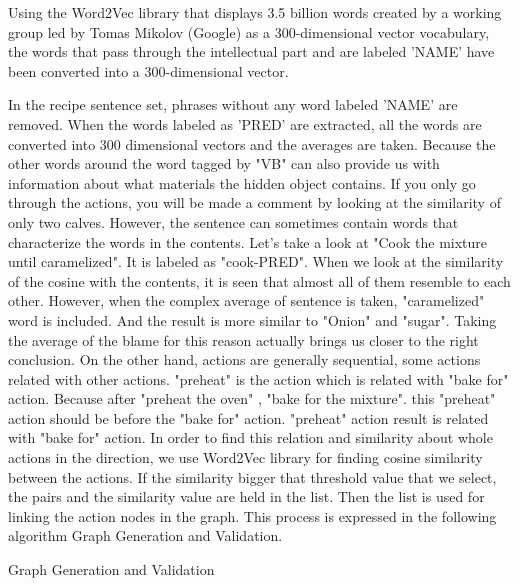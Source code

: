 Using the Word2Vec \cite{word2vec} library that displays 3.5 billion words created by a working group led by Tomas Mikolov (Google) as a 300-dimensional vector vocabulary, the words that pass through the intellectual part and are labeled 'NAME' have been converted into a 300-dimensional vector.

In the recipe sentence set, phrases without any word labeled 'NAME' are removed. When the words labeled as 'PRED' are extracted, all the words are converted into 300 dimensional vectors and the averages are taken. Because the other words around the word tagged by "VB" can also provide us with information about what materials the hidden object contains. If you only go through the actions, you will be made a comment by looking at the similarity of only two calves. However, the sentence can sometimes contain words that characterize the words in the contents. Let's take a look at "Cook the mixture until caramelized". It is labeled as "cook-PRED". When we look at the similarity of the cosine with the contents, it is seen that almost all of them resemble to each other. However, when the complex average of sentence is taken, "caramelized" word is included. And the result is more similar to "Onion" and "sugar". Taking the average of the blame for this reason actually brings us closer to the right conclusion. On the other hand, actions are generally sequential, some actions related with other actions. "preheat" is the action which is related with "bake for" action. Because after "preheat the oven" , "bake for the mixture". this "preheat" action should be before the "bake for" action. "preheat" action  result is related with "bake for" action. In order to find this relation and similarity about whole actions in the direction, we use Word2Vec library for finding cosine similarity between the actions. If the similarity bigger that threshold value that we select, the pairs and the similarity value are held  in the list. Then the list is used for linking the action nodes in the graph. This process is expressed in the following algorithm Graph Generation and Validation.


\begin{algorithm}
\caption{Graph Generation and Validation}
\label{alg:generateGraph}
\end{algorithm}
        

